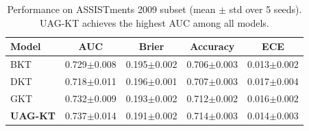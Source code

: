 \begin{table}[h]
\centering
\caption{Performance on ASSISTments 2009 subset (mean $\pm$ std over 5 seeds).
UAG-KT achieves the highest AUC among all models.}
\label{tab:results}
\begin{tabular}{l|cccc}
\toprule
\textbf{Model} & \textbf{AUC} & \textbf{Brier} & \textbf{Accuracy} & \textbf{ECE} \\
\midrule
BKT & 0.729$\pm$0.008 & 0.195$\pm$0.002 & 0.706$\pm$0.003 & 0.013$\pm$0.002 \\
DKT & 0.718$\pm$0.011 & 0.196$\pm$0.001 & 0.707$\pm$0.003 & 0.017$\pm$0.004 \\
GKT & 0.732$\pm$0.009 & 0.193$\pm$0.002 & 0.712$\pm$0.002 & 0.016$\pm$0.002 \\
\textbf{UAG-KT} & 0.737$\pm$0.014 & 0.191$\pm$0.002 & 0.714$\pm$0.003 & 0.014$\pm$0.003 \\
\bottomrule
\end{tabular}
\end{table}
